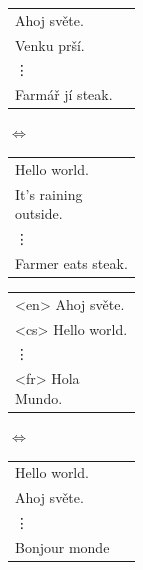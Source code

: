 \begin{figure}[H]
    \begin{center}
        \begin{tabular}{| >{\centering\arraybackslash}p{0.3\linewidth} |}
          \hline
          Ahoj světe. \\
          Venku prší. \\
          \hspace{1mm} \vdots \\
          Farmář jí steak. \\
          \hline
        \end{tabular}
        $\Longleftrightarrow$
        \begin{tabular}{| >{\centering\arraybackslash}p{0.3\linewidth} |}
          \hline
          Hello world. \\
          It's raining outside. \\
          \hspace{1mm} \vdots \\
          Farmer eats steak. \\
          \hline
        \end{tabular}
    \end{center}
    \begin{minipage}[t]{1\linewidth}
        \centering
        \label{subcap:singlePair}
    \end{minipage}%

    \begin{center}
        \begin{tabular}{| >{\centering\arraybackslash}p{0.3\linewidth} |}
          \hline
          <en> Ahoj světe. \\
          <cs> Hello world. \\
          \hspace{1mm} \vdots \\
          <fr> Hola Mundo. \\
          \hline
        \end{tabular}
        $\Longleftrightarrow$
        \begin{tabular}{| >{\centering\arraybackslash}p{0.3\linewidth} |}
          \hline
          Hello world. \\
          Ahoj světe. \\
          \hspace{1mm} \vdots \\
          Bonjour monde \\
          \hline
        \end{tabular}
    \end{center}
    \begin{minipage}[t]{1\linewidth}
        \centering
        \label{subcap:multiLingual}
    \end{minipage}%


\end{figure}
